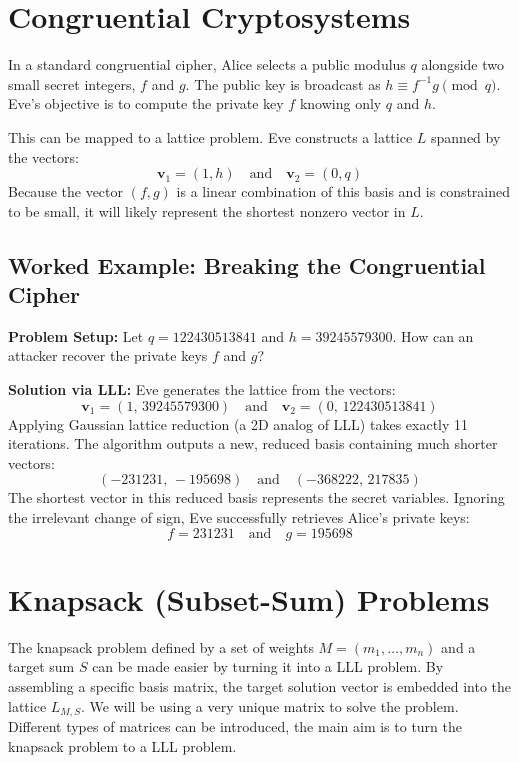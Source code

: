 \documentclass[12pt, a4paper]{article}
\theoremstyle{definition}
\theoremstyle{plain}
\begin{document}
\section{Congruential Cryptosystems}

In a standard congruential cipher, Alice selects a public modulus $q$ alongside two small secret integers, $f$ and $g$. The public key is broadcast as $h \equiv f^{-1}g \pmod{q}$. Eve's objective is to compute the private key $f$ knowing only $q$ and $h$.

This can be mapped to a lattice problem. Eve constructs a lattice $L$ spanned by the vectors:
\[
    \mathbf{v}_1 = (1, h) \quad \text{and} \quad \mathbf{v}_2 = (0, q)
\]
Because the vector $(f, g)$ is a linear combination of this basis and is constrained to be small, it will likely represent the shortest nonzero vector in $L$.

\subsection{Worked Example: Breaking the Congruential Cipher}

\textbf{Problem Setup:} Let $q = 122430513841$ and $h = 39245579300$. How can an attacker recover the private keys $f$ and $g$?

\textbf{Solution via LLL:}
Eve generates the lattice from the vectors:
\[
    \mathbf{v}_1 = (1,\, 39245579300) \quad \text{and} \quad \mathbf{v}_2 = (0,\, 122430513841)
\]
Applying Gaussian lattice reduction (a 2D analog of LLL) takes exactly 11 iterations. The algorithm outputs a new, reduced basis containing much shorter vectors:
\[
    (-231231,\, -195698) \quad \text{and} \quad (-368222,\, 217835)
\]
The shortest vector in this reduced basis represents the secret variables. Ignoring the irrelevant change of sign, Eve successfully retrieves Alice's private keys:
\[
    f = 231231 \quad \text{and} \quad g = 195698
\]

\section{Knapsack (Subset-Sum) Problems}

The knapsack problem defined by a set of weights $M = (m_1, \dots, m_n)$ and a target sum $S$ can be made easier by turning it into a LLL problem. By assembling a specific basis matrix, the target solution vector is embedded into the lattice $L_{M,S}$. We will be using a very unique matrix to solve the problem. Different types of matrices can be introduced, the main aim is to turn the knapsack problem to a LLL problem.
\end{document}
